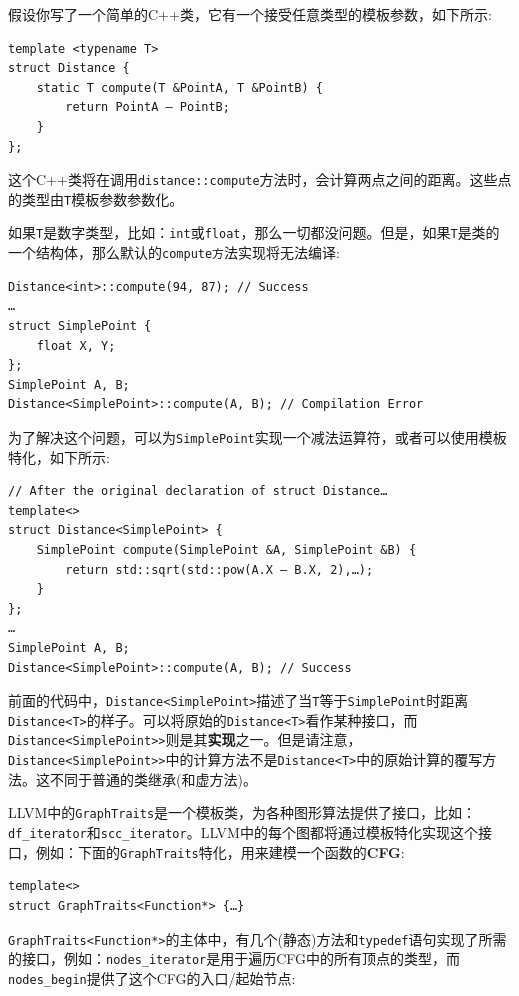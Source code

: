 假设你写了一个简单的C++类，它有一个接受任意类型的模板参数，如下所示:

\begin{lstlisting}[style=styleCXX]
template <typename T>
struct Distance {
	static T compute(T &PointA, T &PointB) {
		return PointA – PointB;
	}
};
\end{lstlisting}

这个C++类将在调用\texttt{distance::compute}方法时，会计算两点之间的距离。这些点的类型由\texttt{T}模板参数参数化。

如果\texttt{T}是数字类型，比如：\texttt{int}或\texttt{float}，那么一切都没问题。但是，如果\texttt{T}是类的一个结构体，那么默认的\texttt{compute方}法实现将无法编译:

\begin{lstlisting}[style=styleCXX]
Distance<int>::compute(94, 87); // Success
…
struct SimplePoint {
	float X, Y;
};
SimplePoint A, B;
Distance<SimplePoint>::compute(A, B); // Compilation Error
\end{lstlisting}

为了解决这个问题，可以为\texttt{SimplePoint}实现一个减法运算符，或者可以使用模板特化，如下所示:

\begin{lstlisting}[style=styleCXX]
// After the original declaration of struct Distance…
template<>
struct Distance<SimplePoint> {
	SimplePoint compute(SimplePoint &A, SimplePoint &B) {
		return std::sqrt(std::pow(A.X – B.X, 2),…);
	}
};
…
SimplePoint A, B;
Distance<SimplePoint>::compute(A, B); // Success
\end{lstlisting}

前面的代码中，\texttt{Distance<SimplePoint>}描述了当\texttt{T}等于\texttt{SimplePoint}时距离\texttt{Distance<T>}的样子。可以将原始的\texttt{Distance<T>}看作某种接口，而\texttt{Distance<SimplePoint>>}则是其\textbf{实现}之一。但是请注意，\texttt{Distance<SimplePoint>>}中的计算方法不是\texttt{Distance<T>}中的原始计算的覆写方法。这不同于普通的类继承(和虚方法)。

LLVM中的\texttt{GraphTraits}是一个模板类，为各种图形算法提供了接口，比如：\texttt{df\_iterator}和\texttt{scc\_iterator}。LLVM中的每个图都将通过模板特化实现这个接口，例如：下面的\texttt{GraphTraits}特化，用来建模一个函数的\textbf{CFG}:

\begin{lstlisting}[style=styleCXX]
template<>
struct GraphTraits<Function*> {…}
\end{lstlisting}

\texttt{GraphTraits<Function*>}的主体中，有几个(静态)方法和\texttt{typedef}语句实现了所需的接口，例如：\texttt{nodes\_iterator}是用于遍历CFG中的所有顶点的类型，而\texttt{nodes\_begin}提供了这个CFG的入口/起始节点:

